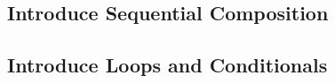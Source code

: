 \subsection{Introduce Sequential Composition}

\begin{minipage}{\textwidth}
\SequenceIntroductionRule*
\end{minipage}

\subsection{Introduce Loops and Conditionals}

\begin{minipage}{\textwidth}
  \IfConditionalIntroductionRule*
\end{minipage}  

